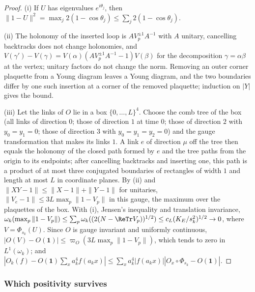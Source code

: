 \begin{proof}
(i) If $U$ has eigenvalues $e^{i\theta_j}$, then $\|1-U\|^2=\max_j
2(1-\cos\theta_j)\le\sum_j2(1-\cos\theta_j)$.

(ii) The holonomy of the inserted loop is $AV_p^{\pm1}A^{-1}$ with $A$
unitary, cancelling backtracks does not change holonomies, and
$V(\gamma')-V(\gamma)=V(\alpha)(AV_p^{\pm1}A^{-1}-1)V(\beta)$ for the
decomposition $\gamma=\alpha\beta$ at the vertex; unitary factors do not
change the norm. Removing an outer corner plaquette from a Young diagram
leaves a Young diagram, and the two boundaries differ by one such insertion
at a corner of the removed plaquette; induction on $|Y|$ gives the bound.

(iii) Let the links of $O$ lie in a box $\{0,\dots,L\}^4$. Choose the comb
tree of the box (all links of direction $0$; those of direction $1$ at time
$0$; those of direction $2$ with $y_0=y_1=0$; those of direction $3$ with
$y_0=y_1=y_2=0$) and the gauge transformation that makes its links $1$. A link
$e$ of direction $\mu$ off the tree then equals the holonomy of the closed
path formed by $e$ and the tree paths from the origin to its endpoints; after
cancelling backtracks and inserting one, this path is a product of at most
three conjugated boundaries of rectangles of width $1$ and length at most $L$ in
coordinate planes. By (ii) and $\|XY-1\|\le\|X-1\|+\|Y-1\|$ for unitaries,
$\|V_e-1\|\le3L\max_p\|1-V_p\|$ in this gauge, the maximum over the
plaquettes of the box. With (i), Jensen's inequality and translation
invariance, $\omega_k(\max_p\|1-V_p\|)\le\sum_p\omega_k((2(N-\ReTr V_p))^{1/2})
\le c_L(K_E/s_k^2)^{1/2}\to0$, where $V=\Phi_{s_k}(U)$. Since $O$ is gauge
invariant and uniformly continuous, $|O(V)-O(\mathbf 1)|\le\varpi_O(3L\max_p
\|1-V_p\|)$, which tends to zero in $L^1(\omega_k)$; and $|O_k(f)-O(\mathbf 1)
\sum_xa_k^4f(a_kx)|\le\sum_xa_k^4|f(a_kx)||O_x\circ\Phi_{s_k}-O(\mathbf 1)|$.
\end{proof}
\subsubsection{Which positivity survives}


